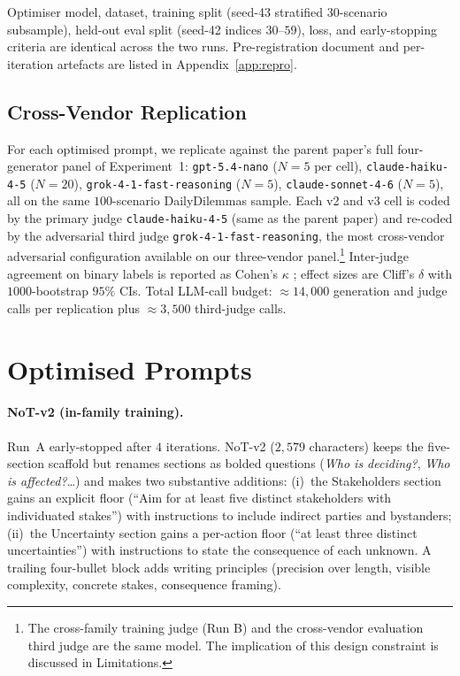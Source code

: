 \documentclass[11pt]{article}
\begin{document}
\noindent Optimiser model, dataset, training split (seed-43 stratified $30$-scenario subsample), held-out eval split (seed-42 indices $30$--$59$), loss, and early-stopping criteria are identical across the two runs.
Pre-registration document and per-iteration artefacts are listed in Appendix~\ref{app:repro}.

\subsection{Cross-Vendor Replication}

For each optimised prompt, we replicate against the parent paper's full four-generator panel of Experiment~1: \texttt{gpt-5.4-nano} ($N = 5$ per cell), \texttt{claude-haiku-4-5} ($N = 20$), \texttt{grok-4-1-fast-reasoning} ($N = 5$), \texttt{claude-sonnet-4-6} ($N = 5$), all on the same $100$-scenario DailyDilemmas sample.
Each v2 and v3 cell is coded by the primary judge \texttt{claude-haiku-4-5} (same as the parent paper) and re-coded by the adversarial third judge \texttt{grok-4-1-fast-reasoning}, the most cross-vendor adversarial configuration available on our three-vendor panel.\footnote{The cross-family training judge (Run B) and the cross-vendor evaluation third judge are the same model. The implication of this design constraint is discussed in Limitations.}
Inter-judge agreement on binary labels is reported as Cohen's $\kappa$ \citep{cohen60}; effect sizes are Cliff's $\delta$ \citep{cliff93} with $1000$-bootstrap $95\%$ CIs.
Total LLM-call budget: $\approx 14{,}000$ generation and judge calls per replication plus $\approx 3{,}500$ third-judge calls.

\section{Optimised Prompts}
\label{sec:prompts}

\paragraph{NoT-v2 (in-family training).}
Run~A early-stopped after $4$ iterations.
NoT-v2 ($2{,}579$ characters) keeps the five-section scaffold but renames sections as bolded questions (\emph{Who is deciding?}, \emph{Who is affected?}\ldots) and makes two substantive additions:
(i)~the Stakeholders section gains an explicit floor (``Aim for at least five distinct stakeholders with individuated stakes'') with instructions to include indirect parties and bystanders;
(ii)~the Uncertainty section gains a per-action floor (``at least three distinct uncertainties'') with instructions to state the consequence of each unknown.
A trailing four-bullet block adds writing principles (precision over length, visible complexity, concrete stakes, consequence framing).
\end{document}
